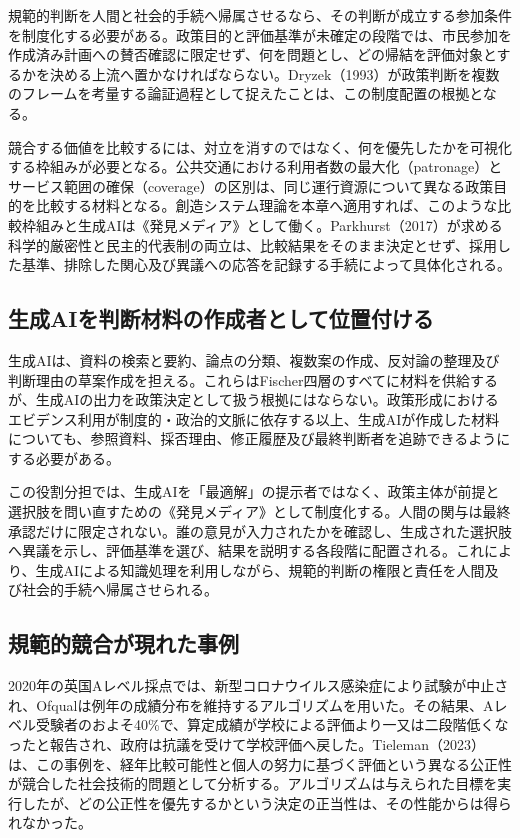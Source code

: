 規範的判断を人間と社会的手続へ帰属させるなら、その判断が成立する参加条件を制度化する必要がある。政策目的と評価基準が未確定の段階では、市民参加を作成済み計画への賛否確認に限定せず、何を問題とし、どの帰結を評価対象とするかを決める上流へ置かなければならない。Dryzek（1993）が政策判断を複数のフレームを考量する論証過程として捉えたことは、この制度配置の根拠となる\cite{dryzek1993policy}。

競合する価値を比較するには、対立を消すのではなく、何を優先したかを可視化する枠組みが必要となる。公共交通における利用者数の最大化（patronage）とサービス範囲の確保（coverage）の区別\cite{walker2008}は、同じ運行資源について異なる政策目的を比較する材料となる。創造システム理論を本章へ適用すれば、このような比較枠組みと生成AIは《発見メディア》として働く。Parkhurst（2017）が求める科学的厳密性と民主的代表制の両立は、比較結果をそのまま決定とせず、採用した基準、排除した関心及び異議への応答を記録する手続によって具体化される\cite{parkhurst2017politics}。

\subsection{生成AIを判断材料の作成者として位置付ける}

生成AIは、資料の検索と要約、論点の分類、複数案の作成、反対論の整理及び判断理由の草案作成を担える。これらはFischer四層のすべてに材料を供給するが、生成AIの出力を政策決定として扱う根拠にはならない。政策形成におけるエビデンス利用が制度的・政治的文脈に依存する以上\cite{suazogaldames2025systematic}、生成AIが作成した材料についても、参照資料、採否理由、修正履歴及び最終判断者を追跡できるようにする必要がある。

この役割分担では、生成AIを「最適解」の提示者ではなく、政策主体が前提と選択肢を問い直すための《発見メディア》として制度化する。人間の関与は最終承認だけに限定されない。誰の意見が入力されたかを確認し、生成された選択肢へ異議を示し、評価基準を選び、結果を説明する各段階に配置される。これにより、生成AIによる知識処理を利用しながら、規範的判断の権限と責任を人間及び社会的手続へ帰属させられる。

\subsection{規範的競合が現れた事例}

2020年の英国Aレベル採点では、新型コロナウイルス感染症により試験が中止され、Ofqualは例年の成績分布を維持するアルゴリズムを用いた。その結果、Aレベル受験者のおよそ40\%で、算定成績が学校による評価より一又は二段階低くなったと報告され、政府は抗議を受けて学校評価へ戻した\cite{ofqual2020alevel,tieleman2023fairness}。Tieleman（2023）は、この事例を、経年比較可能性と個人の努力に基づく評価という異なる公正性が競合した社会技術的問題として分析する\cite{tieleman2023fairness}。アルゴリズムは与えられた目標を実行したが、どの公正性を優先するかという決定の正当性は、その性能からは得られなかった。

